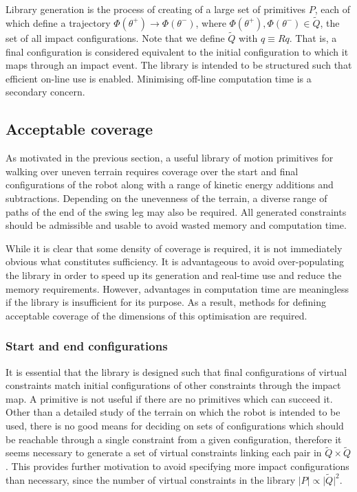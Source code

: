 Library generation is the process of creating of a large set of primitives $P$, each of which define a trajectory $\Phi(\theta^+) \to \Phi(\theta^-)$, where $\Phi(\theta^+), \Phi(\theta^-) \in \tilde{Q}$, the set of all impact configurations. Note that we define $\tilde{Q}$ with $q\equiv Rq$. That is, a final configuration is considered equivalent to the initial configuration to which it maps through an impact event. The library is intended to be structured such that efficient on-line use is enabled. Minimising off-line computation time is a secondary concern.

\subsection{Acceptable coverage}
As motivated in the previous section, a useful library of motion primitives for walking over uneven terrain requires coverage over the start and final configurations of the robot along with a range of kinetic energy additions and subtractions. Depending on the unevenness of the terrain, a diverse range of paths of the end of the swing leg may also be required. All generated constraints should be admissible and usable to avoid wasted memory and computation time.

While it is clear that some density of coverage is required, it is not immediately obvious what constitutes sufficiency. It is advantageous to avoid over-populating the library in order to speed up its generation and real-time use and reduce the memory requirements. However, advantages in computation time are meaningless if the library is insufficient for its purpose. As a result, methods for defining acceptable coverage of the dimensions of this optimisation are required.

\subsubsection{Start and end configurations}
It is essential that the library is designed such that final configurations of virtual constraints match initial configurations of other constraints through the impact map. A primitive is not useful if there are no primitives which can succeed it. Other than a detailed study of the terrain on which the robot is intended to be used, there is no good means for deciding on sets of configurations which should be reachable through a single constraint from a given configuration, therefore it seems necessary to generate a set of virtual constraints linking each pair in $\tilde{Q}\times\tilde{Q}$. This provides further motivation to avoid specifying more impact configurations than necessary, since the number of virtual constraints in the library $\lvert P \rvert \propto \lvert\tilde{Q}\rvert^2$.

